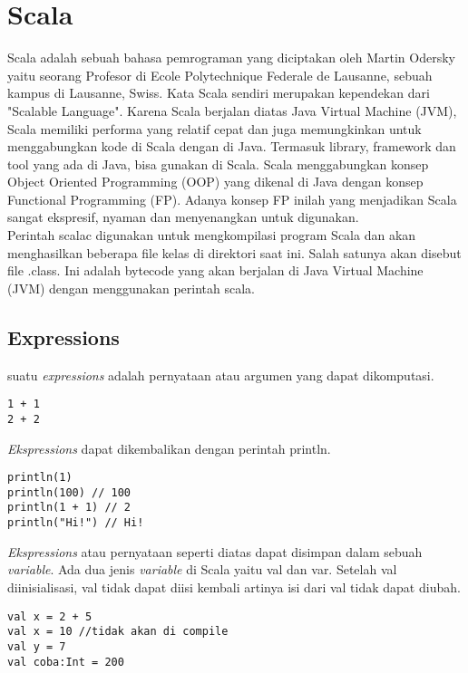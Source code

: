 \section{Scala}


Scala adalah sebuah bahasa pemrograman yang diciptakan oleh Martin Odersky yaitu seorang Profesor di Ecole Polytechnique Federale de Lausanne, sebuah kampus di Lausanne, Swiss. Kata Scala sendiri merupakan kependekan dari "Scalable Language". Karena Scala berjalan diatas Java Virtual Machine (JVM), Scala memiliki performa yang relatif cepat dan juga memungkinkan untuk menggabungkan kode di Scala dengan di Java. Termasuk library, framework dan tool yang ada di Java, bisa gunakan di Scala. Scala menggabungkan konsep Object Oriented Programming (OOP) yang dikenal di Java dengan konsep Functional Programming (FP). Adanya konsep FP inilah yang menjadikan Scala sangat ekspresif, nyaman dan menyenangkan untuk digunakan. \\

Perintah scalac digunakan untuk mengkompilasi program Scala dan akan menghasilkan beberapa file kelas di direktori saat ini. Salah satunya akan disebut file .class. Ini adalah bytecode yang akan berjalan di Java Virtual Machine (JVM) dengan menggunakan perintah scala. \\

\subsection{Expressions}

suatu \textit{expressions} adalah pernyataan atau argumen yang dapat dikomputasi.

\begin{verbatim}
1 + 1
2 + 2 
\end{verbatim}


\textit{Ekspressions} dapat dikembalikan dengan perintah println.

\begin{verbatim}
println(1)
println(100) // 100
println(1 + 1) // 2
println("Hi!") // Hi!
\end{verbatim}


\textit{Ekspressions} atau pernyataan seperti diatas dapat disimpan dalam sebuah \textit{variable}. Ada dua jenis \textit{variable} di Scala yaitu val dan var. Setelah val diinisialisasi, val tidak dapat diisi kembali artinya isi dari val tidak dapat diubah.

\begin{verbatim}
val x = 2 + 5
val x = 10 //tidak akan di compile 
val y = 7
val coba:Int = 200 
\end{verbatim}

